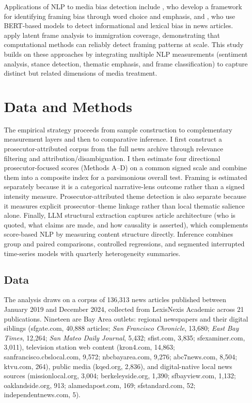 \documentclass[12pt, letterpaper]{article}
\begin{document}
Applications of NLP to media bias detection include \citet{hamborg2019}, who develop a framework for identifying framing bias through word choice and emphasis, and \citet{fan2019}, who use BERT-based models to detect informational and lexical bias in news articles. \citet{card2015} apply latent frame analysis to immigration coverage, demonstrating that computational methods can reliably detect framing patterns at scale. This study builds on these approaches by integrating multiple NLP measurements (sentiment analysis, stance detection, thematic emphasis, and frame classification) to capture distinct but related dimensions of media treatment.


\section{Data and Methods}

\noindent
The empirical strategy proceeds from sample construction to complementary measurement layers and then to comparative inference. I first construct a prosecutor-attributed corpus from the full news archive through relevance filtering and attribution/disambiguation. I then estimate four directional prosecutor-focused scores (Methods A--D) on a common signed scale and combine them into a composite index for a parsimonious overall test. Framing is estimated separately because it is a categorical narrative-lens outcome rather than a signed intensity measure. Prosecutor-attributed theme detection is also separate because it measures explicit prosecutor--theme linkage rather than local thematic salience alone. Finally, LLM structural extraction captures article architecture (who is quoted, what claims are made, and how causality is asserted), which complements score-based NLP by measuring content structure directly. Inference combines group and paired comparisons, controlled regressions, and segmented interrupted time-series models with quarterly heterogeneity summaries.

\subsection{Data}
\label{sec:data}

The analysis draws on a corpus of 136,313 news articles published between January 2019 and December 2024, collected from LexisNexis Academic across 21 publications. Nineteen are Bay Area outlets: regional newspapers and their digital siblings (sfgate.com, 40{,}888 articles; \emph{San Francisco Chronicle}, 13{,}680; \emph{East Bay Times}, 12{,}264; \emph{San Mateo Daily Journal}, 5{,}432; sfist.com, 3{,}835; sfexaminer.com, 3{,}011), television station web content (kron4.com, 14{,}863; sanfrancisco.cbslocal.com, 9{,}572; nbcbayarea.com, 9{,}276; abc7news.com, 8{,}504; ktvu.com, 264), public media (kqed.org, 2{,}836), and digital-native local news sources (missionlocal.org, 3{,}004; berkeleyside.org, 1{,}390; sfbayview.com, 1{,}132; oaklandside.org, 913; alamedapost.com, 169; sfstandard.com, 52; independentnews.com, 5).
\end{document}
